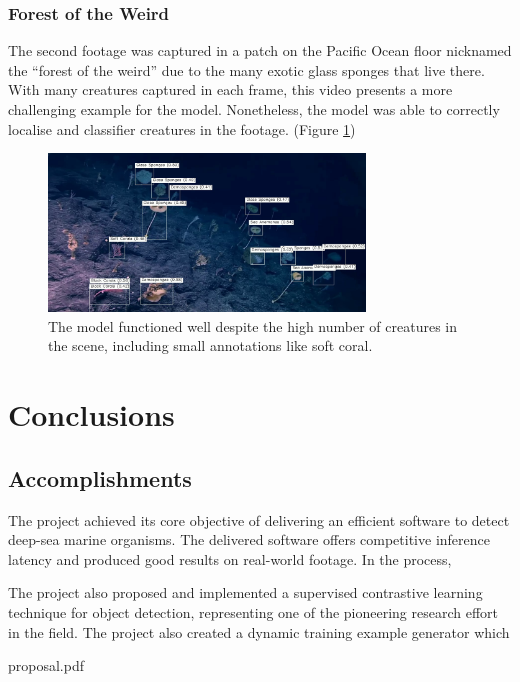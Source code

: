 \documentclass[12pt,a4paper,twoside,openany]{report}
\begin{document}
\subsection{Forest of the Weird}
The second footage was captured in a patch on the Pacific Ocean floor nicknamed the ``forest of the weird'' due to the many exotic glass sponges that live there. With many creatures captured in each frame, this video presents a more challenging example for the model. Nonetheless, the model was able to correctly localise and classifier creatures in the footage. (Figure \ref{fig:forest1})

\begin{figure}[H]
    \centering
    \includegraphics[width=0.75\textwidth]{figs/eval/video/forest/good.png}
    \caption{The model functioned well despite the high number of creatures in the scene, including small annotations like soft coral.}
    \label{fig:forest1}
\end{figure}


\chapter{Conclusions}

\section{Accomplishments}
The project achieved its core objective of delivering an efficient software to detect deep-sea marine organisms. The delivered software offers competitive inference latency and produced good results on real-world footage. In the process, 

The project also proposed and implemented a supervised contrastive learning technique for object detection, representing one of the pioneering research effort in the field. The project also created a dynamic training example generator which 


\printbibliography[
heading=bibintoc,
title={Bibliography}
]

\appendix



     {proposal.pdf}
\end{document}
